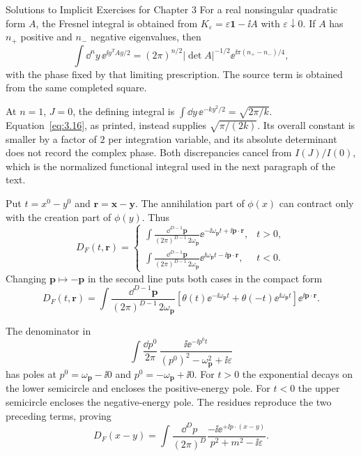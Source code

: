 \begin{bankssolutions}{Solutions to Implicit Exercises for Chapter 3}
For a real nonsingular quadratic form $A$, the Fresnel integral is obtained
from $K_\varepsilon=\varepsilon\mathbf1-\ii A$ with
$\varepsilon\downarrow0$.  If $A$ has $n_+$ positive and $n_-$ negative
eigenvalues, then
\[
 \int\dd^ny\,\ee^{\ii y^TAy/2}
 =(2\pi)^{n/2}|\det A|^{-1/2}
   \ee^{\ii\pi(n_+-n_-)/4},
\]
with the phase fixed by that limiting prescription.  The source term is
obtained from the same completed square.

At $n=1$, $J=0$, the defining integral is
$\int\dd y\,\ee^{-ky^2/2}=\sqrt{2\pi/k}$.  Equation~\eqref{eq:3.16}, as
printed, instead supplies $\sqrt{\pi/(2k)}$.  Its overall constant is smaller
by a factor of $2$ per integration variable, and its absolute determinant
does not record the complex phase.  Both discrepancies cancel from
$I(J)/I(0)$, which is the normalized functional integral used in the next
paragraph of the text.

Put $t=x^0-y^0$ and $\mathbf r=\mathbf x-\mathbf y$.  The annihilation part of
$\phi(x)$ can contract only with the creation part of $\phi(y)$.  Thus
\[
 D_F(t,\mathbf r)=
 \begin{cases}
 \displaystyle
 \int\frac{\dd^{D-1}\mathbf p}{(2\pi)^{D-1}\,2\omega_{\mathbf p}}
 \ee^{-\ii\omega_{\mathbf p}t+\ii\mathbf p\cdot\mathbf r},&t>0,\\[8pt]
 \displaystyle
 \int\frac{\dd^{D-1}\mathbf p}{(2\pi)^{D-1}\,2\omega_{\mathbf p}}
 \ee^{\ii\omega_{\mathbf p}t-\ii\mathbf p\cdot\mathbf r},&t<0.
 \end{cases}
\]
Changing $\mathbf p\mapsto-\mathbf p$ in the second line puts both cases in
the compact form
\[
 D_F(t,\mathbf r)=\int\frac{\dd^{D-1}\mathbf p}{(2\pi)^{D-1}\,2\omega_{\mathbf p}}
 \left[\theta(t)\ee^{-\ii\omega_{\mathbf p}t}
       +\theta(-t)\ee^{\ii\omega_{\mathbf p}t}\right]
 \ee^{\ii\mathbf p\cdot\mathbf r}.
\]

The denominator in
\[
 \int\frac{\dd p^0}{2\pi}\,
 \frac{\ii\ee^{-\ii p^0t}}
 {(p^0)^2-\omega_{\mathbf p}^2+\ii\varepsilon}
\]
has poles at $p^0=\omega_{\mathbf p}-\ii0$ and
$p^0=-\omega_{\mathbf p}+\ii0$.  For $t>0$ the exponential decays on the
lower semicircle and encloses the positive-energy pole.  For $t<0$ the upper
semicircle encloses the negative-energy pole.  The residues reproduce the
two preceding terms, proving
\[
 D_F(x-y)=\int\frac{\dd^Dp}{(2\pi)^D}
 \frac{-\ii\ee^{+\ii p\mathbin{\cdot}(x-y)}}
 {p^2+m^2-\ii\varepsilon}.
\]


\end{bankssolutions}
